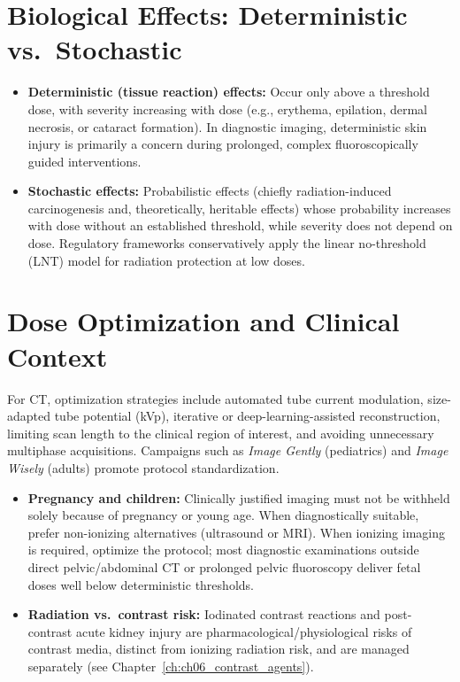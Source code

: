 \section{Biological Effects: Deterministic vs.\ Stochastic}
\begin{itemize}
    \item \textbf{Deterministic (tissue reaction) effects:} Occur only above a threshold dose, with severity increasing with dose (e.g., erythema, epilation, dermal necrosis, or cataract formation). In diagnostic imaging, deterministic skin injury is primarily a concern during prolonged, complex fluoroscopically guided interventions.
    \item \textbf{Stochastic effects:} Probabilistic effects (chiefly radiation-induced carcinogenesis and, theoretically, heritable effects) whose probability increases with dose without an established threshold, while severity does not depend on dose. Regulatory frameworks conservatively apply the linear no-threshold (LNT) model for radiation protection at low doses.
\end{itemize}

\section{Dose Optimization and Clinical Context}
For CT, optimization strategies include automated tube current modulation, size-adapted tube potential (kVp), iterative or deep-learning-assisted reconstruction, limiting scan length to the clinical region of interest, and avoiding unnecessary multiphase acquisitions. Campaigns such as \emph{Image Gently} (pediatrics) and \emph{Image Wisely} (adults) promote protocol standardization.

\begin{itemize}
    \item \textbf{Pregnancy and children:} Clinically justified imaging must not be withheld solely because of pregnancy or young age. When diagnostically suitable, prefer non-ionizing alternatives (ultrasound or MRI). When ionizing imaging is required, optimize the protocol; most diagnostic examinations outside direct pelvic/abdominal CT or prolonged pelvic fluoroscopy deliver fetal doses well below deterministic thresholds.
    \item \textbf{Radiation vs.\ contrast risk:} Iodinated contrast reactions and post-contrast acute kidney injury are pharmacological/physiological risks of contrast media, distinct from ionizing radiation risk, and are managed separately (see Chapter~\ref{ch:ch06_contrast_agents}).
\end{itemize}

